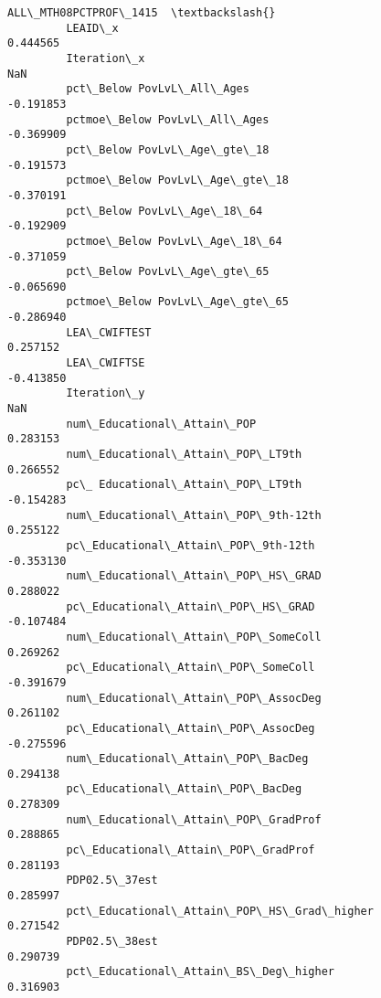 \documentclass[11pt]{article}
\begin{document}
\begin{Verbatim}[commandchars=\\\{\}]
                                                    ALL\_MTH08PCTPROF\_1415  \textbackslash{}
         LEAID\_x                                                 0.444565   
         Iteration\_x                                                  NaN   
         pct\_Below PovLvL\_All\_Ages                              -0.191853   
         pctmoe\_Below PovLvL\_All\_Ages                           -0.369909   
         pct\_Below PovLvL\_Age\_gte\_18                            -0.191573   
         pctmoe\_Below PovLvL\_Age\_gte\_18                         -0.370191   
         pct\_Below PovLvL\_Age\_18\_64                             -0.192909   
         pctmoe\_Below PovLvL\_Age\_18\_64                          -0.371059   
         pct\_Below PovLvL\_Age\_gte\_65                            -0.065690   
         pctmoe\_Below PovLvL\_Age\_gte\_65                         -0.286940   
         LEA\_CWIFTEST                                            0.257152   
         LEA\_CWIFTSE                                            -0.413850   
         Iteration\_y                                                  NaN   
         num\_Educational\_Attain\_POP                              0.283153   
         num\_Educational\_Attain\_POP\_LT9th                        0.266552   
         pc\_ Educational\_Attain\_POP\_LT9th                       -0.154283   
         num\_Educational\_Attain\_POP\_9th-12th                     0.255122   
         pc\_Educational\_Attain\_POP\_9th-12th                     -0.353130   
         num\_Educational\_Attain\_POP\_HS\_GRAD                      0.288022   
         pc\_Educational\_Attain\_POP\_HS\_GRAD                      -0.107484   
         num\_Educational\_Attain\_POP\_SomeColl                     0.269262   
         pc\_Educational\_Attain\_POP\_SomeColl                     -0.391679   
         num\_Educational\_Attain\_POP\_AssocDeg                     0.261102   
         pc\_Educational\_Attain\_POP\_AssocDeg                     -0.275596   
         num\_Educational\_Attain\_POP\_BacDeg                       0.294138   
         pc\_Educational\_Attain\_POP\_BacDeg                        0.278309   
         num\_Educational\_Attain\_POP\_GradProf                     0.288865   
         pc\_Educational\_Attain\_POP\_GradProf                      0.281193   
         PDP02.5\_37est                                           0.285997   
         pct\_Educational\_Attain\_POP\_HS\_Grad\_higher               0.271542   
         PDP02.5\_38est                                           0.290739   
         pct\_Educational\_Attain\_BS\_Deg\_higher                    0.316903   

\end{Verbatim}
\end{document}
